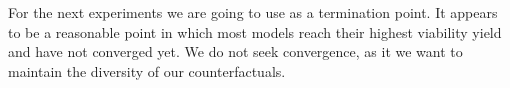 \documentclass[./../../paper.tex]{subfiles}
\begin{document}



For the next experiments we are going to use  as a termination point. It appears to be a reasonable point in which most models reach their highest viability yield and have not converged yet. We do not seek convergence, as it we want to maintain the diversity of our counterfactuals. 
\end{document}
